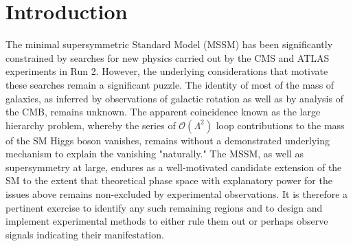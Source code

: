\clearpage
\section{Introduction}
\label{sec:search-introduction}

The minimal supersymmetric Standard Model (MSSM) has been significantly constrained by searches for new physics carried out by the CMS and ATLAS experiments in Run 2. However, the underlying considerations that motivate these searches remain a significant puzzle. The identity of most of the mass of galaxies, as inferred by observations of galactic rotation as well as by analysis of the CMB, remains unknown. The apparent coincidence known as the large hierarchy problem, whereby the series of $\mathcal{O}(\Lambda^2)$ loop contributions to the mass of the SM Higgs boson vanishes, remains without a demonstrated underlying mechanism to explain the vanishing "naturally." The MSSM, as well as supersymmetry at large, endures as a well-motivated candidate extension of the SM to the extent that theoretical phase space with explanatory power for the issues above remains non-excluded by experimental observations. It is therefore a pertinent exercise to identify any such remaining regions and to design and implement experimental methods to either rule them out or perhaps observe signals indicating their manifestation.

